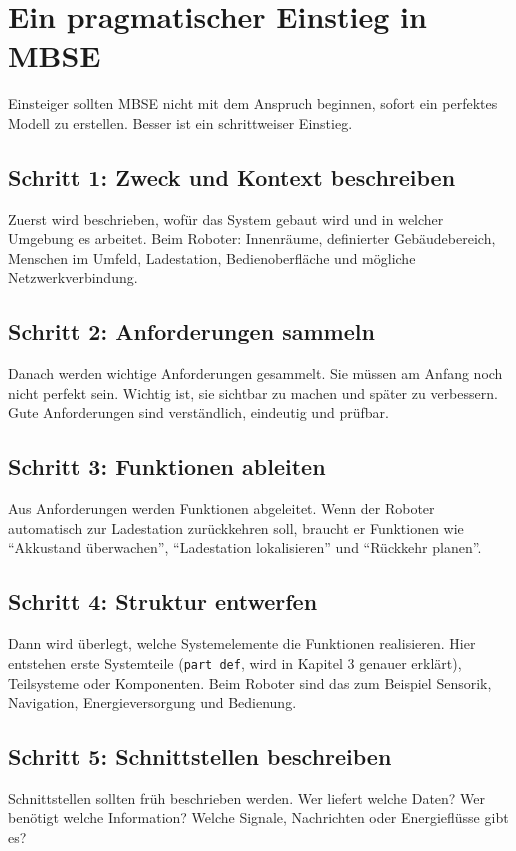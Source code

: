 \section{Ein pragmatischer Einstieg in MBSE}
Einsteiger sollten MBSE nicht mit dem Anspruch beginnen, sofort ein perfektes Modell zu erstellen. Besser ist ein schrittweiser Einstieg.

\subsection{Schritt 1: Zweck und Kontext beschreiben}
Zuerst wird beschrieben, wofür das System gebaut wird und in welcher Umgebung es arbeitet. Beim Roboter: Innenräume, definierter Gebäudebereich, Menschen im Umfeld, Ladestation, Bedienoberfläche und mögliche Netzwerkverbindung.

\subsection{Schritt 2: Anforderungen sammeln}
Danach werden wichtige Anforderungen gesammelt. Sie müssen am Anfang noch nicht perfekt sein. Wichtig ist, sie sichtbar zu machen und später zu verbessern. Gute Anforderungen sind verständlich, eindeutig und prüfbar.

\subsection{Schritt 3: Funktionen ableiten}
Aus Anforderungen werden Funktionen abgeleitet. Wenn der Roboter automatisch zur Ladestation zurückkehren soll, braucht er Funktionen wie \enquote{Akkustand überwachen}, \enquote{Ladestation lokalisieren} und \enquote{Rückkehr planen}.

\subsection{Schritt 4: Struktur entwerfen}
Dann wird überlegt, welche Systemelemente die Funktionen realisieren. Hier entstehen erste Systemteile (\texttt{part def}, wird in Kapitel 3 genauer erklärt), Teilsysteme oder Komponenten. Beim Roboter sind das zum Beispiel Sensorik, Navigation, Energieversorgung und Bedienung.

\subsection{Schritt 5: Schnittstellen beschreiben}
Schnittstellen sollten früh beschrieben werden. Wer liefert welche Daten? Wer benötigt welche Information? Welche Signale, Nachrichten oder Energieflüsse gibt es?

